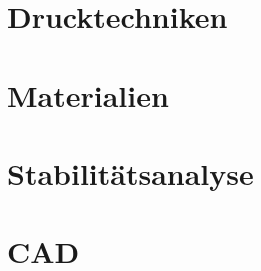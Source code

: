 

\section{Drucktechniken}



\section{Materialien}



\section{Stabilitätsanalyse}


\section{\acf{CAD}}